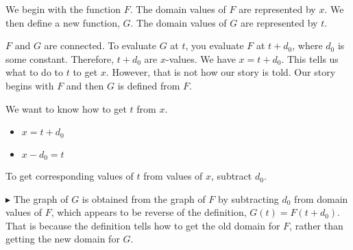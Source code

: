 \documentclass{ximera}
\begin{document}
We begin with the function $F$.  The domain values of $F$ are represented by $x$.  We then define a new function, $G$. The domain values of $G$ are represented by $t$. 

$F$ and $G$ are connected.  To evaluate $G$ at $t$, you evaluate $F$ at $t + d_0$, where $d_0$ is some constant.  Therefore, $t + d_0$ are $x$-values. We have $x = t + d_0$.  This tells us what to do to $t$ to get $x$.  However, that is not how our story is told.  Our story begins with $F$ and then $G$ is defined from $F$.  

We want to know how to get $t$ from $x$.  


\begin{itemize}
\item $x = t + d_0$

\item $x - d_0 = t$
\end{itemize}


To get corresponding values of $t$ from values of $x$, subtract $d_0$.   



$\blacktriangleright$  The graph of $G$ is obtained from the graph of $F$ by subtracting $d_0$ from domain values of $F$, which appears to be reverse of the definition, $G(t) = F(t+d_0)$.  That is because the definition tells how to get the old domain for $F$, rather than getting the new domain for $G$.
\end{document}
